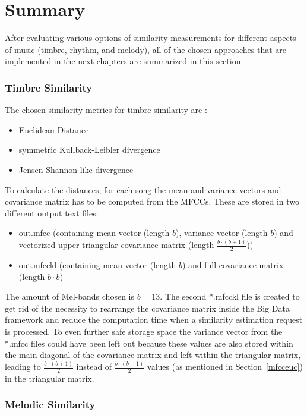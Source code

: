 \section{Summary}\label{sumfeat}

After evaluating various options of similarity measurements for different aspects of music (timbre, rhythm, and melody), all of the chosen approaches that are implemented in the next chapters are summarized in this section. 

\subsubsection{Timbre Similarity}

The chosen similarity metrics for timbre similarity are : 
\begin{itemize}
	\setlength\itemsep{-0.5em}
	\item Euclidean Distance
	\item symmetric Kullback-Leibler divergence
	\item Jensen-Shannon-like divergence
\end{itemize}
To calculate the distances, for each song the mean and variance vectors and covariance matrix has to be computed from the MFCCs. These are stored in two different output text files: 
\begin{itemize}
	\setlength\itemsep{-0.5em}
	\item out.mfcc (containing mean vector (length $b$), variance vector (length $b$) and vectorized upper triangular covariance matrix (length $\frac{b \cdot (b+1)}{2}$))
	\item out.mfcckl (containing mean vector (length $b$) and full covariance matrix (length $b \cdot b$)
\end{itemize}
The amount of Mel-bands chosen is $b = 13$. The second *.mfcckl file is created to get rid of the necessity to rearrange the covariance matrix inside the Big Data framework and reduce the computation time when a similarity estimation request is processed. To even further safe storage space the variance vector from the *.mfcc files could have been left out because these values are also stored within the main diagonal of the covariance matrix and left within the triangular matrix, leading to $\frac{b \cdot (b+1)}{2}$ instead of $\frac{b \cdot (b-1)}{2}$ values (as mentioned in Section~\ref{mfcceuc}) in the triangular matrix.\\

\subsubsection{Melodic Similarity}

